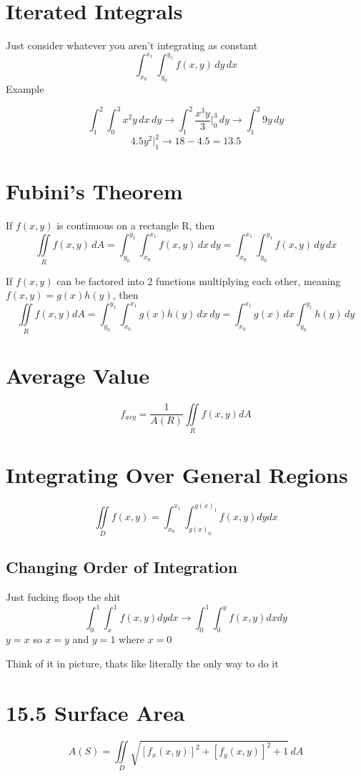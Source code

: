 \documentclass{report}
\begin{document}
\section{Iterated Integrals}
Just consider whatever you aren't integrating as constant
$$
\int_{x_0}^{x_1}\int_{y_0}^{y_1}f(x, y) \,dy \,dx
$$
Example

$$
\int_1^2 \int_0^3 x^2 y \,dx \,dy 
\rightarrow
\int_1^2 \frac{x^3 y}{3} \bigg|_0^3 \,dy 
\rightarrow
\int_1^2 9y \,dy
$$
$$
4.5y^2 \bigg|_1^2
\rightarrow
18 - 4.5 = 13.5
$$

\section*{Fubini's Theorem}
If $f(x, y)$ is continuous on a rectangle R, then
$$
\iint \limits_R f(x, y) \,dA = 
\int_{y_0}^{y_1} \int_{x_0}^{x_1} f(x, y) \,dx \,dy =
\int_{x_0}^{x_1} \int_{y_0}^{y_1} f(x, y) \,dy \,dx
$$

If $f(x, y)$ can be factored into 2 functions multiplying each other, meaning $f(x, y) = g(x)h(y)$, then
$$
\iint \limits_R f(x, y) dA = 
\int_{y_0}^{y_1} \int_{x_0}^{x_1} g(x) h(y) \,dx \,dy = 
\int_{x_0}^{x_1} g(x) \,dx \int_{y_0}^{y_1} h(y) \,dy
$$

\section{Average Value}
$$
f_{avg} = \frac{1}{A(R)} \iint \limits_R f(x, y) dA
$$

\section{Integrating Over General Regions}
$$
\iint \limits_D f(x, y) = \int_{x_0}^{x_1} \int_{g(x)_0}^{g(x)_1} f(x, y) dy dx
$$

\subsection{Changing Order of Integration}
Just fucking floop the shit
$$
\int_0^1 \int_x^1 f(x, y) dy dx \longrightarrow
\int_0^1 \int_0^y f(x, y) dx dy
$$
$y=x$ so $x=y$ and $y=1$ where $x=0$

Think of it in picture, thats like literally the only way to do it

\section{15.5 Surface Area}
$$
A(S) = \iint \limits_D \sqrt{[f_x(x, y)]^2 + [f_y(x, y)]^2 + 1} \,dA
$$
\end{document}
